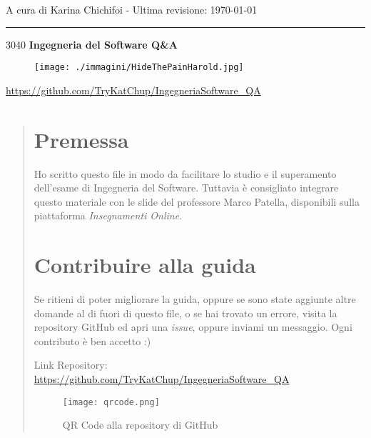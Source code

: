 \documentclass{article}
\makeatletter
\newcommand\HUGE{\@setfontsize\Huge{30}{40}}
\makeatother
\begin{document}
\begin{titlepage}
	\centering
	\large
	A cura di Karina Chichifoi - Ultima revisione: \today

	\noindent\rule{15cm}{0.2pt}

	\vspace{1.5cm}

	\HUGE
	\textbf{Ingegneria del Software Q\&A}

	\vspace{2cm}
	\begin{figure}[htb!]
		\centering
		\texttt{[image: ./immagini/HideThePainHarold.jpg]}
	\end{figure}
	\normalsize
	\url{https://github.com/TryKatChup/IngegneriaSoftware_QA}

	\clearpage
\end{titlepage}
\renewcommand{\abstractname}{}
\begin{abstract}
	\section*{Premessa}
	Ho scritto questo file in modo da facilitare lo studio e il superamento dell'esame di Ingegneria del Software.
	Tuttavia è consigliato integrare questo materiale con le slide del professore Marco Patella, disponibili sulla piattaforma \textit{Insegnamenti Online}.

	\section*{Contribuire alla guida}

	Se ritieni di poter migliorare la guida, oppure se sono state aggiunte altre domande al di fuori di questo file, o se hai trovato un errore, visita la repository GitHub ed apri una \textit{issue}, oppure inviami un messaggio. Ogni contributo è ben accetto :)

	\vspace{4mm}
	Link Repository: \url{https://github.com/TryKatChup/IngegneriaSoftware_QA}

	\vspace{5mm}

	\begin{figure}[htb!]
		\centering
		\texttt{[image: qrcode.png]}
		\caption{QR Code alla repository di GitHub}
	\end{figure}
\end{abstract}



\end{document}
